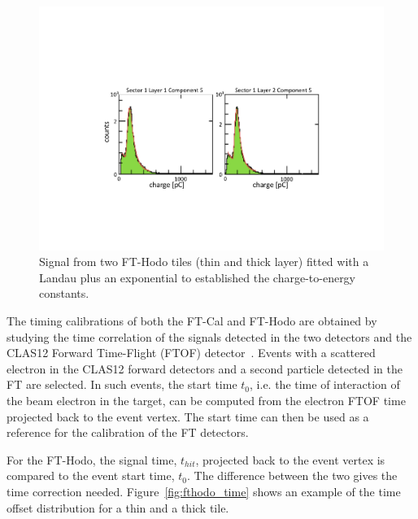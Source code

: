 \begin{figure}
\includegraphics[width=1.0\columnwidth]{fig/fthodo_mips.pdf}
\caption{Signal from two FT-Hodo tiles (thin and thick layer) fitted with a Landau plus an exponential to established
  the charge-to-energy constants.}
\label{fig:fthodo_mips}
\end{figure}

The timing calibrations of both the FT-Cal and FT-Hodo are obtained by studying the time correlation of the signals
detected in the two detectors and the CLAS12 Forward Time-Flight (FTOF) detector~\cite{ftof}. Events with a
scattered electron in the CLAS12 forward detectors and a second particle detected in the FT are selected. In
such events, the start time $t_0$, i.e. the time of interaction of the beam electron in the target, can be computed
from the electron FTOF time projected back to the event vertex. The start time can then be used as a reference
for the calibration of the FT detectors. 

For the FT-Hodo, the signal time, $t_{hit}$, projected back to the event vertex is compared to the event start time,
$t_0$. The difference between the two gives the time correction needed. Figure~\ref{fig:fthodo_time} shows an
example of the time offset distribution for a thin and a thick tile.

